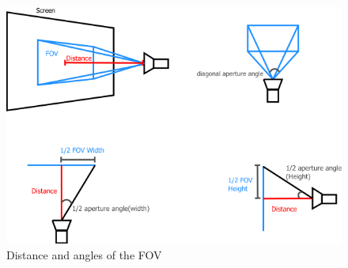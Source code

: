 \documentclass[journal,final,a4paper,twoside]{PS}
\begin{document}
\begin{figure}[h]
\begin{center}
\includegraphics[scale=0.4]{./pics/distanceandangles.png}
\caption{Distance and angles of the FOV}
\label{fig:dist}
\end{center}
\end{figure}
\end{document}
